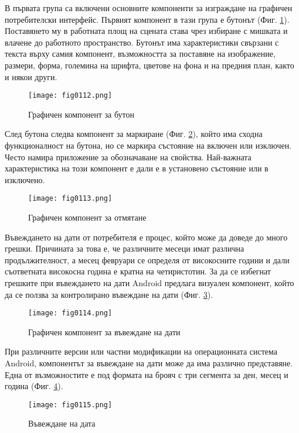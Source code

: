 В първата група са включени основните компоненти за изграждане на графичен потребителски интерфейс. Първият компонент в тази група е бутонът (Фиг. \ref{fig0112}). Поставянето му в работната площ на сцената става чрез избиране с мишката и влачене до работното пространство. Бутонът има характеристики свързани с текста върху самия компонент, възможността за поставяне на изображение, размери, форма, големина на шрифта, цветове на фона и на предния план, както и някои други.

\begin{figure}[H]
  \centering
  \texttt{[image: fig0112.png]}
  \caption{Графичен компонент за бутон}
\label{fig0112}
\end{figure}

След бутона следва компонент за маркиране (Фиг. \ref{fig0113}), който има сходна функционалност на бутона, но се маркира състояние на включен или изключен. Често намира приложение за обозначаване на свойства. Най-важната характеристика на този компонент е дали е в установено състояние или в изключено. 

\begin{figure}[H]
  \centering
  \texttt{[image: fig0113.png]}
  \caption{Графичен компонент за отмятане}
\label{fig0113}
\end{figure}

Въвеждането на дати от потребителя е процес, който може да доведе до много грешки. Причината за това е, че различните месеци имат различна продължителност, а месец февруари се определя от високосните години и дали съответната високосна година е кратна на четиристотин. За да се избегнат грешките при въвеждането на дати Android предлага визуален компонент, който да се ползва за контролирано въвеждане на дати (Фиг. \ref{fig0114}).

\begin{figure}[H]
  \centering
  \texttt{[image: fig0114.png]}
  \caption{Графичен компонент за въвеждане на дати}
\label{fig0114}
\end{figure}

При различните версии или частни модификации на операционната система Android, компонентът за въвеждане на дати може да има различно представяне. Една от възможностите е под формата на брояч с три сегмента за ден, месец и година (Фиг. \ref{fig0115}).

\begin{figure}[H]
  \centering
  \texttt{[image: fig0115.png]}
  \caption{Въвеждане на дата}
\label{fig0115}
\end{figure}

